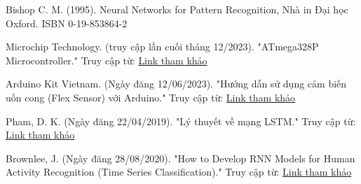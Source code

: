 \newpage
{}
\renewcommand\refname{Tài liệu tham khảo}
\begin{thebibliography}{3}
    \item Bishop C. M. (1995). Neural Networks for Pattern Recognition, Nhà in Đại học Oxford. ISBN 0-19-853864-2
    \item Microchip Technology. (truy cập lần cuối tháng 12/2023). "ATmega328P Microcontroller." Truy cập từ: \href{https://www.microchip.com/en-us/product/ATmega328P}{Link tham khảo} 
    \item Arduino Kit Vietnam. (Ngày đăng 12/06/2023). "Hướng dẫn sử dụng cảm biến uốn cong (Flex Sensor) với Arduino." Truy cập từ: \href{https://arduinokit.vn/huong-dan-su-dung-cam-bien-uon-cong-flex-sensor-voi-arduino/}{Link tham khảo} 
    \item Pham, D. K. (Ngày đăng 22/04/2019). "Lý thuyết về mạng LSTM." Truy cập từ: \href{https://phamdinhkhanh.github.io/2019/04/22/Ly_thuyet_ve_mang_LSTM.html?fbclid=IwAR0rBn2SL1vPNYmLgixLra-BoMMb6f98mhPrMxv_BhX13_9sK3_4da1vN6c}{Link tham khảo}
    \item Brownlee, J. (Ngày đăng 28/08/2020). "How to Develop RNN Models for Human Activity Recognition (Time Series Classification)." Truy cập từ: \href{https://machinelearningmastery.com/how-to-develop-rnn-models-for-human-activity-recognition-time-series-classification/}{Link tham khảo}  
 
\end{thebibliography}